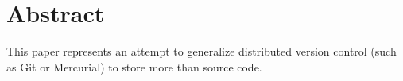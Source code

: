\chapter{Abstract}

This paper represents an attempt to generalize distributed version control (such
as Git or Mercurial) to store more than source code.
